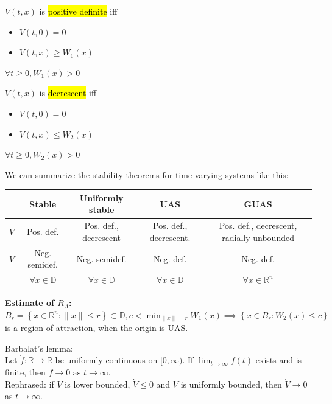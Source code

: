 \begin{definition}
    $V(t,x)$ is \hl{positive definite} iff
    \begin{itemize}[topsep=0pt]
        \item $V(t,0)=0$
        \item $V(t,x) \geq W_1(x)$
    \end{itemize}
    $\forall t \geq 0, W_1(x)>0$
\end{definition}
\begin{definition}
    $V(t,x)$ is \hl{decrescent} iff
    \begin{itemize}[topsep=0pt]
        \item $V(t,0)=0$
        \item $V(t,x) \leq W_2(x)$
    \end{itemize}
    $\forall t \geq 0, W_2(x)>0$
\end{definition}

We can summarize the stability theorems for time-varying systems like this:
\begin{center}
    \begin{tabular}{|c|c|c|c|c|}
        \hline
        & Stable & Uniformly stable & UAS & GUAS \\
        \hline
        $V$ & Pos. def. & Pos. def., decrescent & Pos. def., decrescent. & Pos. def., decrescent, radially unbounded \\
        \hline
        $\dot{V}$ & Neg. semidef. & Neg. semidef. & Neg. def. & Neg. def. \\
        \hline
        & $\forall x \in \mathbb{D}$ & $\forall x \in \mathbb{D}$ & $\forall x \in \mathbb{D}$ & $\forall x \in \mathbb{R}^n$ \\
        \hline
    \end{tabular} 
    \label{tab:stability}
\end{center}

\textbf{Estimate of $R_A$:} $B_{r}=\left\{x \in \mathbb{R}^{n}:\|x\| \leq r\right\} \subset \mathbb{D}, c<\min _{\|x\|=r} W_{1}(x) \implies \left\{x \in B_{r}: W_{2}(x) \leq c\right\}$ is a region of attraction, when the origin is UAS.

\begin{tcolorbox}[colback=white, colframe=teal]
\begin{lemma}
    Barbalat's lemma: \\
    Let $\dot{f} : \mathbb{R} \rightarrow \mathbb{R}$ be uniformly continuous on $[0, \infty)$. If $\lim _{t \rightarrow \infty} f(t)$ exists and is finite, then $\dot{f} \rightarrow 0 \text { as } t \rightarrow \infty$.\\
    Rephrased: if $V$ is lower bounded, $\dot{V} \leq 0$ and $\ddot{V}$ is uniformly bounded, then $\dot{V} \rightarrow 0$ as $t \rightarrow \infty$.
\end{lemma}
\end{tcolorbox}

